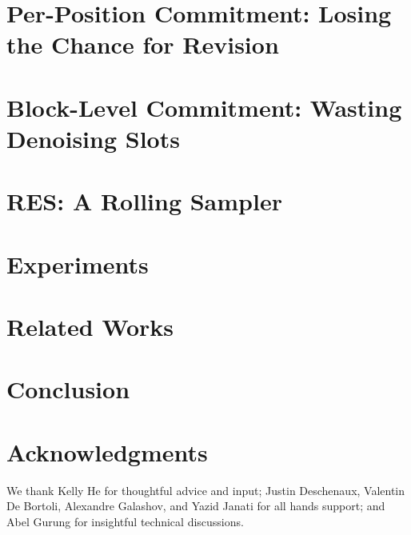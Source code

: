 \documentclass[11pt, a4paper, logo, copyright, gdm]{google}
\begin{document}
\section{Per-Position Commitment: Losing the Chance for Revision}
\label{sec:too-early}


\section{Block-Level Commitment: Wasting Denoising Slots}
\label{sec:too-late}


\section{RES: A Rolling Sampler}
\label{sec:method}


\section{Experiments}
\label{sec:experiments}


\section{Related Works}
\label{sec:adjacentworks}


\section{Conclusion}


\section*{Acknowledgments}
We thank Kelly He for thoughtful advice and input; Justin Deschenaux, Valentin De Bortoli, Alexandre Galashov, and Yazid Janati for all hands support; and Abel Gurung for insightful technical discussions.
\clearpage
\begingroup
\small
\setlength{\bibsep}{3pt}
\setlength{\parskip}{0pt}


\endgroup

\clearpage
\appendix

\end{document}
